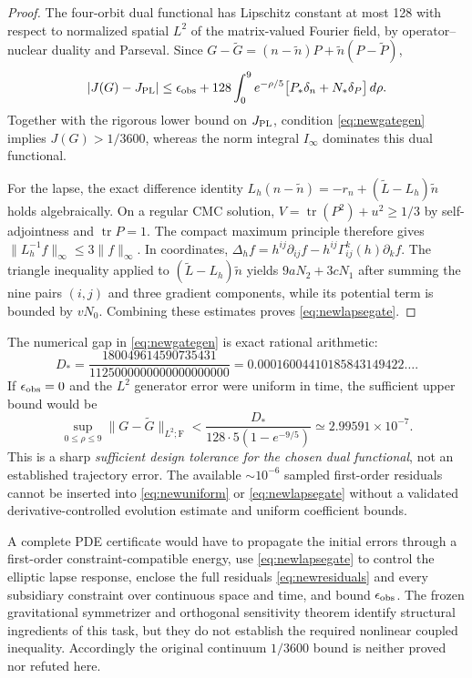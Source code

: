\documentclass[11pt,a4paper]{article}
\theoremstyle{remark}
\newcommand{\tr}{\operatorname{tr}}
\begin{document}
\begin{proof}
The four-orbit dual functional has Lipschitz constant at most 128 with respect to normalized spatial $L^2$ of the matrix-valued Fourier field, by operator--nuclear duality and Parseval. Since
$G-\widetilde G=(n-\widetilde n)P+\widetilde n(P-\widetilde P)$,
\[
|J(G)-J_{\rm PL}|\le\epsilon_{\rm obs}+
128\int_0^9e^{-\rho/5}\bigl[P_*\delta_n+N_*\delta_P\bigr]\,d\rho.
\]
Together with the rigorous lower bound on $J_{\rm PL}$, condition \eqref{eq:newgategen} implies $J(G)>1/3600$, whereas the norm integral $I_\infty$ dominates this dual functional.

For the lapse, the exact difference identity
$L_h(n-\widetilde n)=-r_n+(\widetilde L-L_h)\widetilde n$
holds algebraically. On a regular CMC solution, $V=\tr(P^2)+u^2\ge1/3$ by self-adjointness and $\tr P=1$. The compact maximum principle therefore gives $\|L_h^{-1}f\|_\infty\le3\|f\|_\infty$. In coordinates,
$\Delta_h f=h^{ij}\partial_{ij}f-h^{ij}\Gamma^k_{ij}(h)\partial_kf$.
The triangle inequality applied to $(\widetilde L-L_h)\widetilde n$ yields $9aN_2+3cN_1$ after summing the nine pairs $(i,j)$ and three gradient components, while its potential term is bounded by $vN_0$. Combining these estimates proves \eqref{eq:newlapsegate}.
\end{proof}

The numerical gap in \eqref{eq:newgategen} is exact rational arithmetic:
\begin{equation}\label{eq:newmargin}
D_*=\frac{180049614590735431}{1125000000000000000000}
=0.00016004410185843149422\ldots.
\end{equation}
If $\epsilon_{\rm obs}=0$ and the $L^2$ generator error were uniform in time, the sufficient upper bound would be
\begin{equation}\label{eq:newuniform}
\sup_{0\le\rho\le9}\|G-\widetilde G\|_{L^2;\mathrm F}
<\frac{D_*}{128\cdot5(1-e^{-9/5})}
\simeq2.99591\times10^{-7}.
\end{equation}
This is a sharp \emph{sufficient design tolerance for the chosen dual functional}, not an established trajectory error. The available $\sim10^{-6}$ sampled first-order residuals cannot be inserted into \eqref{eq:newuniform} or \eqref{eq:newlapsegate} without a validated derivative-controlled evolution estimate and uniform coefficient bounds.

A complete PDE certificate would have to propagate the initial errors through a first-order constraint-compatible energy, use \eqref{eq:newlapsegate} to control the elliptic lapse response, enclose the full residuals \eqref{eq:newresiduals} and every subsidiary constraint over continuous space and time, and bound $\epsilon_{\rm obs}$. The frozen gravitational symmetrizer and orthogonal sensitivity theorem identify structural ingredients of this task, but they do not establish the required nonlinear coupled inequality. Accordingly the original continuum $1/3600$ bound is neither proved nor refuted here.
\end{document}
